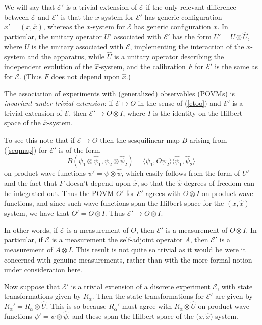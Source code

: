 \documentclass[12pt]{article}
\newcommand{\eq}[1]{(\ref{#1})}
\newcommand{\wf}{wave function}
\renewcommand{\a}{\alpha}
\newcommand{\ot}{\otimes}
\newcommand{\Aa}{R_{\a}}
\newcommand{\E}{\mbox{$\mathscr{E}$}}
\begin{document}
We will say that $\E'$ is a trivial extension of $\E$ if the only
relevant difference between $\E$ and $\E'$ is that the $x$-system for
$\E'$ has generic configuration $x'=(x,\hat{x})$, whereas the
$x$-system for $\E$ has generic configuration $x$. In particular, the
unitary operator $U'$ associated with $\E'$ has the form $U'=
U\ot\hat{U}$, where $U$ is the unitary associated with \E{},
implementing the interaction of the $x$-system and the apparatus,
while $\hat{U}$ is a unitary operator describing the independent
evolution of the $\hat{x}$-system, and the calibration $F$ for $\E'$
is the same as for $\E$. (Thus $F$ does not depend upon $\hat{x}$.)

The association of experiments with (generalized) observables (POVMs)
is \emph{invariant under trivial extension}: if $\E\mapsto O$ in the
sense of \eq{etoo} and $\E'$ is a trivial extension of $\E$, then
$\E'\mapsto O\ot I$, where $I$ is the identity on the Hilbert space of
the $\hat{x}$-system.


To see this note that if $\E\mapsto O$ then the sesquilinear map $B$
arising {}from \eq{seqmap} for $\E'$ is of the form
$$
B(\psi_1\ot \hat{\psi}_1, \psi_2\ot \hat{\psi}_2) = \langle\psi_1,
O\psi_2\rangle \langle\hat{\psi}_1, \hat{\psi}_2\rangle$$
on product
\wf{}s $\psi'= \psi\ot \hat{\psi}$, which easily follows {}from the
form of $U'$ and the fact that $F$ doesn't depend upon $\hat{x}$, so
that the $\hat{x}$-degrees of freedom can be integrated out. Thus the
POVM $O'$ for $\E'$ agrees with $ O\ot I$ on product \wf{}s, and since
such wave functions span the Hilbert space for the
$(x,\hat{x})$-system, we have that $O'= O\ot I$. Thus $\E'\mapsto O\ot
I$.

In other words, if \E{}{} is a measurement of $O$, then $\E'$ is a
measurement of $O\ot I$. In particular, if \E{} is a measurement the
self-adjoint operator $A$, then $\E'$ is a measurement of $A\ot I$.
This result is not quite so trivial as it would be were it concerned
with genuine measurements, rather than with the more formal notion
under consideration here.

Now suppose that $\E'$ is a trivial extension of a discrete experiment
$\E$, with state transformations given by $\Aa$. Then the state
transformations for $\E{}'$ are given by $\Aa' = \Aa \ot \hat{U}$.
This is so because $\Aa'$ must agree with $\Aa \ot \hat{U}$ on product
\wf{}s $\psi'= \psi\ot \hat{\psi}$, and these span the Hilbert space
of the $(x,\hat{x}$)-system.
\end{document}

